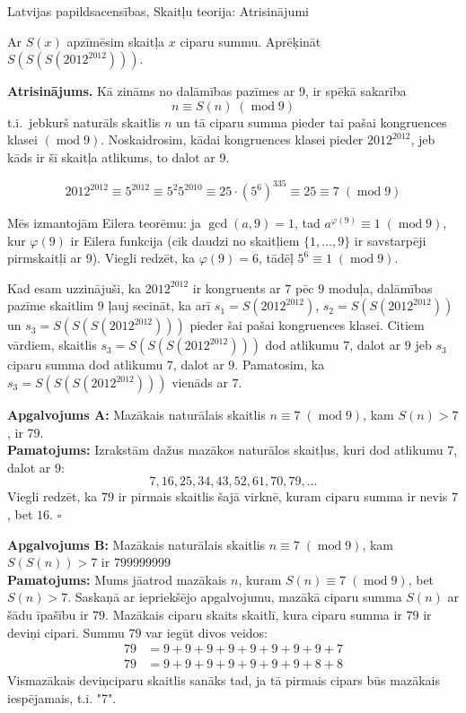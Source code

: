 \documentclass[11pt]{article}
\newenvironment{problem}[1]
  {\renewcommand\theinnercustomthm{#1}\innercustomthm}
  {\endinnercustomthm}
\begin{document}
\begin{center}
{\LARGE Latvijas papildsacensības, Skaitļu teorija: Atrisinājumi}
\end{center}



\begin{problem}{LV.TST.2012.9-12.1.SOL} \label{LV.TST.2012.9-12.1.SOL}
Ar $S(x)$ apzīmēsim skaitļa $x$ ciparu summu.
Aprēķināt\\ $S(S(S(2012^{2012})))$.
\end{problem}

{\small
{\bf Atrisinājums.} 
Kā zināms no dalāmības pazīmes ar $9$, ir spēkā
sakarība
\[ n \equiv S(n)\;(\operatorname{mod} 9)\]
t.i.\ jebkurš naturāls skaitlis $n$
un tā ciparu summa pieder tai pašai kongruences klasei $(\operatorname{mod} 9)$.
No\-skaid\-ro\-sim, kādai kongruences klasei pieder $2012^{2012}$, jeb
kāds ir šī skaitļa atlikums, to dalot ar $9$.

\[ 2012^{2012} \equiv 5^{2012} \equiv 5^2 5^{2010} \equiv 25 \cdot (5^6)^{335} \equiv 25 \equiv 7\;(\operatorname{mod} 9) \]

Mēs izmantojām Eilera teorēmu: ja $\operatorname{gcd}(a,9) = 1$, tad $a^{\varphi(9)} \equiv 1\;(\operatorname{mod} 9)$,
kur $\varphi(9)$ ir Eilera funkcija (cik daudzi no skaitļiem $\{ 1,\ldots,9 \}$ ir savstarpēji
pirmskaitļi ar $9$). Viegli redzēt, ka $\varphi(9) = 6$, tādēļ $5^6 \equiv 1\;(\operatorname{mod} 9)$.

Kad esam uzzinājuši, ka $2012^{2012}$ ir kongruents ar $7$ pēc $9$ moduļa,
dalāmības pazīme skaitlim $9$ ļauj secināt, ka arī $s_1 = S(2012^{2012})$, $s_2 = S(S(2012^{2012}))$
un $s_3 = S(S(S(2012^{2012})))$ pieder šai pašai kongruences klasei. Citiem vārdiem,
skaitlis $s_3 = S(S(S(2012^{2012})))$ dod atlikumu $7$, dalot ar $9$ jeb
$s_3$ ciparu summa dod atlikumu $7$, dalot ar $9$.
Pamatosim, ka $s_3 = S(S(S(2012^{2012})))$ vienāds ar $7$.

{\bf Apgalvojums A:}
Mazākais naturālais skaitlis $n \equiv 7\;(\operatorname{mod} 9)$, kam
$S(n) > 7$, ir 79.\\
{\bf Pamatojums:} Izrakstām dažus mazākos naturālos skaitļus, kuri dod atlikumu $7$,
dalot ar $9$:
\[ 7, 16, 25, 34, 43, 52, 61, 70, 79, \ldots \]
Viegli redzēt, ka $79$ ir pirmais skaitlis šajā virknē, kuram ciparu summa ir nevis $7$,
bet $16$. $\square$

{\bf Apgalvojums B:}
Mazākais naturālais skaitlis $n \equiv 7\;(\operatorname{mod} 9)$, kam
$S(S(n)) > 7$ ir $799999999$\\
{\bf Pamatojums:} Mums jāatrod mazākais $n$, kuram $S(n) \equiv 7\;(\operatorname{mod} 9)$,
bet $S(n) > 7$. Saskaņā ar iepriekšējo apgalvojumu, mazākā ciparu summa $S(n)$ ar šādu
īpašību ir $79$. Mazākais ciparu skaits skaitlī, kura ciparu summa ir $79$ ir deviņi cipari.
Summu $79$ var iegūt divos veidos:
\begin{align}
79 &= 9+9+9+9+9+9+9+9+7 \nonumber \\
79 &= 9+9+9+9+9+9+9+8+8 \nonumber
\end{align}
Vismazākais deviņciparu skaitlis sanāks tad, ja tā pirmais cipars būs mazākais iespējamais,
t.i. "7".

}
\end{document}
